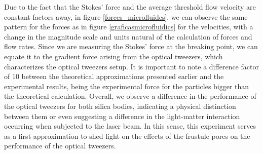 \documentclass[letterpaper,12pt,oneside]{book}
\begin{document}
Due to the fact that the Stokes' force and the average threshold flow velocity are constant factors away, in figure \ref{forces_microfluidcs}, we can observe the same pattern for the forces as in figure \ref{graficasmicrofluidics} for the velocities, with a change in the magnitude scale and units natural of the calculation of forces and flow rates. 
Since we are measuring the Stokes' force at the breaking point, we can equate it to the gradient force arising from the optical tweezers, which characterizes the optical tweezers setup. It is important to note a difference factor of 10 between the theoretical approximations presented earlier and the experimental results, being the experimental force for the particles bigger than the theoretical calculation. Overall, we observe a difference in the performance of the optical tweezers for both silica bodies, indicating a physical distinction between them or even suggesting a difference in the light-matter interaction occurring when subjected to the laser beam. In this sense, this experiment serves as a first approximation to shed light on the effects of the frustule pores on the performance of the optical tweezers.

    
\end{document}
